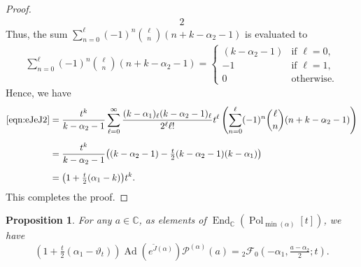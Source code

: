 \documentclass[a4paper,11pt,reqno]{amsart}
\newcommand{\CC}{\mathbb{C}}
\newcommand{\calF}{\mathcal{F}}
\newcommand{\calP}{\mathcal{P}}
\newcommand{\0}{{\bf 0}}
\newcommand{\C}{\mathbb{C}}
\newcommand{\1}{{\bf 1}}
\DeclareMathOperator{\Ad}{Ad}
\DeclareMathOperator{\End}{End}
\DeclareMathOperator{\Pol}{Pol}
\newcommand{\wJ}{\widetilde{J}}
\theoremstyle{plain}
\newtheorem{proposition}[equation]{Proposition}
\theoremstyle{definition}
\numberwithin{equation}{section}
\theoremstyle{definition}
\begin{document}
\begin{appendices}
\begin{proof}
\begin{alignat*}{2}
\end{alignat*}
Thus, the sum $\sum_{n=0}^\ell(-1)^n\binom{\ell}{n}(n+k-\alpha_2-1)$ is 
evaluated to
\begin{align*}
\sum_{n=0}^\ell(-1)^n\binom{\ell}{n}(n+k-\alpha_2-1)
=
\begin{cases}
(k-\alpha_2-1) & \text{if $\ell=0$},\\[5pt]
-1 & \text{if $\ell=1$},\\[3pt]
0 & \text{otherwise}.
\end{cases}
\end{align*}
Hence, we have 
\begin{align*}
\eqref{eqn:eJeJ2}
&=\frac{t^k}{k-\alpha_2-1}
\sum_{\ell=0}^\infty \frac{(k-\alpha_1)_\ell(k-\alpha_2-1)_\ell}{2^\ell \ell!}t^\ell
\left(\sum_{n=0}^\ell(-1)^n\binom{\ell}{n}(n+k-\alpha_2-1)\right)\\[5pt]
&=\frac{t^k}{k-\alpha_2-1}
\big( (k-\alpha_2-1)-\tfrac{t}{2} (k-\alpha_2-1)(k-\alpha_1)\big)\\[5pt]
&=\big(1+\tfrac{t}{2}(\alpha_1-k)\big)t^k.
\end{align*}
This completes the proof.
\end{proof}

\begin{proposition}\label{prop:eDsec9}
For any $a\in \C$, 
as elements of $\End_\CC(\Pol_{\min(\alpha)}[t])$, we have
\begin{equation*}
(1+\tfrac{t}{2}(\alpha_1-\vartheta_t))\Ad(e^{\wJ(\alpha)})\calP^{(\alpha)}(a)
={}_2\calF_0(-\alpha_1,\tfrac{a-\alpha_2}{2};t).
\end{equation*}
\end{proposition}


\end{appendices}
\end{document}
